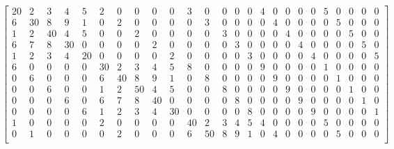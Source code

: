 \documentclass[10pt]{book}
\begin{document}
\begin{mdSnippets}
\begin{mdDisplaySnippet}[a876a3cd34adc11a8b4c94f43c1f2699]
\end{mdDisplaySnippet}%
\begin{mdDisplaySnippet}[9fef68a6d78f4fb0a3e0153523e84f1a]%
\begin{mdDiv}[class={mathdisplay,math-display},color={},math-needpdf={}]%
\[%
\begin{bmatrix}
20 &  2 &  3 &  4 &  5 &  2 &  0 &  0 &  0 &  0 &  3 &  0 &  0 &  0 &  0 &  4 &  0 &  0 &  0 &  0 &  5 &  0 &  0 &  0 &  0 \\
6  & 30 &  8 &  9 &  1 &  0 &  2 &  0 &  0 &  0 &  0 &  3 &  0 &  0 &  0 &  0 &  4 &  0 &  0 &  0 &  0 &  5 &  0 &  0 &  0 \\
1  & 2  & 40 &  4 &  5 &  0 &  0 &  2 &  0 &  0 &  0 &  0 &  3 &  0 &  0 &  0 &  0 &  4 &  0 &  0 &  0 &  0 &  5 &  0 &  0 \\
6  & 7  & 8  & 30 &  0 &  0 &  0 &  0 &  2 &  0 &  0 &  0 &  0 &  3 &  0 &  0 &  0 &  0 &  4 &  0 &  0 &  0 &  0 &  5 &  0 \\
1  & 2  & 3  & 4  & 20 &  0 &  0 &  0 &  0 &  2 &  0 &  0 &  0 &  0 &  3 &  0 &  0 &  0 &  0 &  4 &  0 &  0 &  0 &  0 &  5 \\
6  & 0  & 0  & 0  & 0  & 30 &  2 &  3 &  4 &  5 &  8 &  0 &  0 &  0 &  0 &  9 &  0 &  0 &  0 &  0 &  1 &  0 &  0 &  0 &  0 \\
0  & 6  & 0  & 0  & 0  & 6  & 40 &  8 &  9 &  1 &  0 &  8 &  0 &  0 &  0 &  0 &  9 &  0 &  0 &  0 &  0 &  1 &  0 &  0 &  0 \\
0  & 0  & 6  & 0  & 0  & 1  & 2  & 50 &  4 &  5 &  0 &  0 &  8 &  0 &  0 &  0 &  0 &  9 &  0 &  0 &  0 &  0 &  1 &  0 &  0 \\
0  & 0  & 0  & 6  & 0  & 6  & 7  & 8  & 40 &  0 &  0 &  0 &  0 &  8 &  0 &  0 &  0 &  0 &  9 &  0 &  0 &  0 &  0 &  1 &  0 \\
0  & 0  & 0  & 0  & 6  & 1  & 2  & 3  & 4  & 30 &  0 &  0 &  0 &  0 &  8 &  0 &  0 &  0 &  0 &  9 &  0 &  0 &  0 &  0 &  1 \\
1  & 0  & 0  & 0  & 0  & 2  & 0  & 0  & 0  & 0  & 40 &  2 &  3 &  4 &  5 &  4 &  0 &  0 &  0 &  0 &  5 &  0 &  0 &  0 &  0 \\
0  & 1  & 0  & 0  & 0  & 0  & 2  & 0  & 0  & 0  & 6  & 50 &  8 &  9 &  1 &  0 &  4 &  0 &  0 &  0 &  0 &  5 &  0 &  0 &  0 \\

\end{bmatrix}\]
\end{mdDiv}
\end{mdDisplaySnippet}
\end{mdSnippets}
\end{document}
